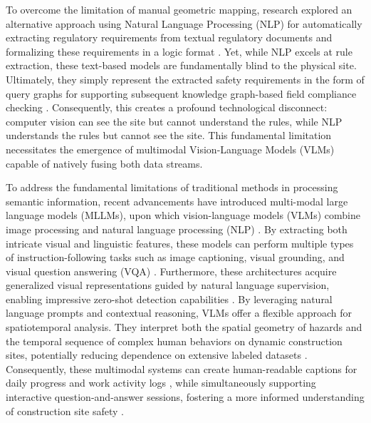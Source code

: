 \documentclass[10pt,letterpaper]{article}
\begin{document}
To overcome the limitation of manual geometric mapping, research explored an alternative approach using Natural Language Processing (NLP) for automatically extracting regulatory requirements from textual regulatory documents and formalizing these requirements in a logic format \cite{zhang2015}. Yet, while NLP excels at rule extraction, these text-based models are fundamentally blind to the physical site. Ultimately, they simply represent the extracted safety requirements in the form of query graphs for supporting subsequent knowledge graph-based field compliance checking \cite{wang2023}. Consequently, this creates a profound technological disconnect: computer vision can see the site but cannot understand the rules, while NLP understands the rules but cannot see the site. This fundamental limitation necessitates the emergence of multimodal Vision-Language Models (VLMs) capable of natively fusing both data streams.

To address the fundamental limitations of traditional methods in processing semantic information, recent advancements have introduced multi-modal large language models (MLLMs), upon which vision-language models (VLMs) combine image processing and natural language processing (NLP) \cite{chan2025}. By extracting both intricate visual and linguistic features, these models can perform multiple types of instruction-following tasks such as image captioning, visual grounding, and visual question answering (VQA) \cite{chan2025}. Furthermore, these architectures acquire generalized visual representations guided by natural language supervision, enabling impressive zero-shot detection capabilities \cite{zhang2025}. By leveraging natural language prompts and contextual reasoning, VLMs offer a flexible approach for spatiotemporal analysis. They interpret both the spatial geometry of hazards and the temporal sequence of complex human behaviors on dynamic construction sites, potentially reducing dependence on extensive labeled datasets \cite{bui2026}. Consequently, these multimodal systems can create human-readable captions for daily progress and work activity logs \cite{jung2024}, while simultaneously supporting interactive question-and-answer sessions, fostering a more informed understanding of construction site safety \cite{hussain2026}.
\end{document}

